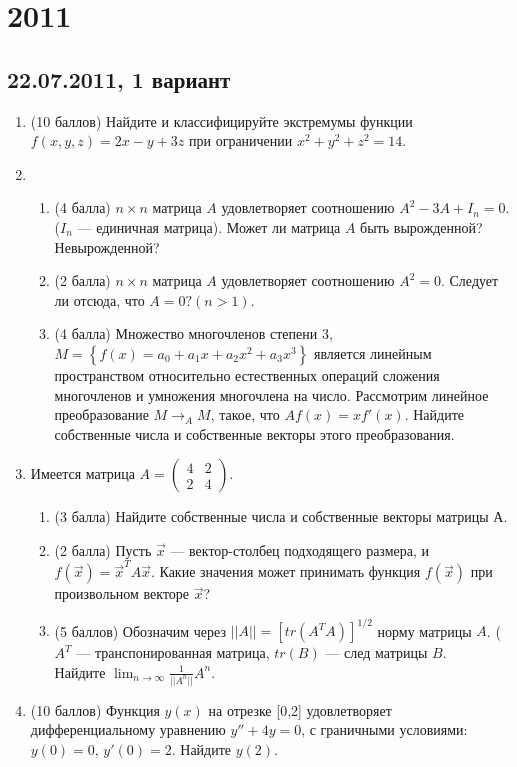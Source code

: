 \documentclass[pdftex,12pt,a4paper]{article}
\begin{document}
\section{2011}

\subsection{22.07.2011, 1 вариант}
\begin{enumerate}
\item (10 баллов) Найдите и классифицируйте экстремумы функции $f(x,y,z)=2x-y+3z$ при ограничении $x^2+y^2+z^2=14$.\\
\item \begin{enumerate}
\item (4 балла) $n\times n$ матрица $A$ удовлетворяет соотношению $A^2-3A+I_n=0$. ($I_n$ --- единичная матрица). Может ли матрица $A$ быть вырожденной? Невырожденной?
\item (2 балла) $n\times n$ матрица $A$ удовлетворяет соотношению $A^2=0$. Следует ли отсюда, что $A=0? (n>1)$.
\item (4 балла) Множество многочленов степени 3, $M=\left\{f(x)=a_0+a_1x+a_2x^2+a_3x^3\right\}$ является линейным пространством относительно естественных операций сложения многочленов и умножения многочлена на число. Рассмотрим линейное преобразование $M\longrightarrow_A M$, такое, что $Af(x)=xf'(x)$. Найдите собственные числа и собственные векторы этого преобразования.
\end{enumerate}
\item Имеется матрица $A=\left(\begin{array}{cc}
4 & 2\\
2 & 4
\end{array}\right)$.
\begin{enumerate}
\item (3 балла) Найдите собственные числа и собственные векторы матрицы А.
\item (2 балла) Пусть $\vec{x}$ --- вектор-столбец подходящего размера, и $f(\vec{x})=\vec{x}^T A \vec{x}$. Какие значения может принимать функция $f(\vec{x})$ при произвольном векторе $\vec{x}$?
\item  (5 баллов) Обозначим через $||A||=[tr(A^TA)]^{1/2}$ норму матрицы $A$. ($A^T$ --- транспонированная матрица, $tr(B)$ --- след матрицы $B$.\\
Найдите $\lim_{n\to \infty}\frac{1}{||A^n||} A^n$.
\end{enumerate}
\item (10 баллов) Функция $y(x)$ на отрезке [0,2] удовлетворяет дифференциальному уравнению $y''+4y=0$, с граничными условиями: $y(0)=0$, $y'(0)=2$. Найдите $y(2)$.\\

\end{enumerate}
\end{document}
